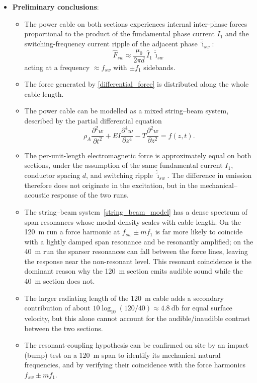 \begin{itemize}
	\item[--] \textbf{Preliminary conclusions}:
	\begin{itemize}
		\item[--] The power cable on both sections experiences internal inter-phase
		forces proportional to the product of the fundamental phase current $I_1$
		and the switching-frequency current ripple of the adjacent phase
		$\hat{\tilde\imath}_{sw}$:
		\begin{equation}
			\boxed{\;\hat F_{sw}\approx\frac{\mu_0}{2\pi d}\,\hat I_1\,\hat{\tilde\imath}_{sw}\;}
			\label{differential_force}
		\end{equation}
		acting at a frequency $\approx f_{sw}$ with $\pm f_1$ sidebands.
		\item[--] The force generated by \eqref{differential_force} is distributed
		along the whole cable length.
		\item[--] The power cable can be modelled as a mixed string--beam system,
		described by the partial differential equation
		\begin{equation}
			\rho_A\frac{\partial^2 w}{\partial t^2}
			+EI\frac{\partial^4 w}{\partial z^4}
			-T\frac{\partial^2 w}{\partial z^2}
			=f(z,t).
			\label{string_beam_model}
		\end{equation}
		\item[--] The per-unit-length electromagnetic force is approximately equal
		on both sections, under the assumption of the same fundamental current
		$I_1$, conductor spacing $d$, and switching ripple
		$\hat{\tilde\imath}_{sw}$. The difference in emission therefore does not
		originate in the excitation, but in the mechanical--acoustic response of
		the two runs.
		\item[--] The string--beam system~\eqref{string_beam_model} has a dense
		spectrum of span resonances whose modal density scales with cable length.
		On the \SI{120}{\meter} run a force harmonic at $f_{sw}\pm m f_1$ is far
		more likely to coincide with a lightly damped span resonance and be
		resonantly amplified; on the \SI{40}{\meter} run the sparser resonances can
		fall between the force lines, leaving the response near the non-resonant
		level. This resonant coincidence is the dominant reason why the
		\SI{120}{\meter} section emits audible sound while the \SI{40}{\meter}
		section does not.
		\item[--] The larger radiating length of the \SI{120}{\meter} cable adds a
		secondary contribution of about $10\log_{10}(120/40)\approx\SI{4.8}{\decibel}$
		for equal surface velocity, but this alone cannot account for the
		audible/inaudible contrast between the two sections.
		\item[--] The resonant-coupling hypothesis can be confirmed on site by an
		impact (bump) test on a \SI{120}{\meter} span to identify its mechanical
		natural frequencies, and by verifying their coincidence with the force
		harmonics $f_{sw}\pm m f_1$.
	\end{itemize}
\end{itemize}
